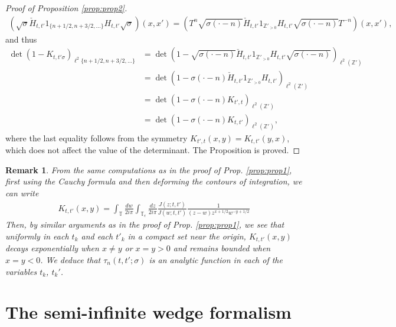 \documentclass[12pt]{amsart}
\newtheorem{rem}[thm]{Remark}
\theoremstyle{definition}
\newcommand{\Z}{\mathbb{Z}}
\newcommand{\T}{\mathbb{T}}
\begin{document}
\begin{proof}[Proof of Proposition \ref{prop:prop2}]
\begin{align*}
    \left(\sqrt{\sigma} \check{H}_{t,t'} \mathfrak{1}_{\{n+1/2,n+3/2,\dots\}}H_{t,t'} \sqrt{\sigma}\right)(x,x')=\left(T^n\sqrt{\sigma(\cdot -n)}\check{H}_{t,t'}\mathfrak{1}_{\Z'_{>0}}H_{t,t'}\sqrt{\sigma(\cdot -n)} T^{-n}\right)(x,x'),
\end{align*}
and thus
\begin{align*}
\det \left( 1 -K_{t,t'\sigma} \right)_{\ell^2 \{n+1/2,n+3/2, \dots \}}&= \det \left( 1- \sqrt{\sigma (\cdot -n) } \check{H}_{t,t'} \mathfrak{1}_{\Z'_{> 0}} H_{t,t'} \sqrt{\sigma( \cdot - n) } \right)_{\ell^2(\Z')} \\
&= \det \left( 1- \sigma( \cdot - n ) \check{ H}_{t,t'} \mathfrak{1}_{ \Z'_{> 0}} H_{t,t'}  \right)_{\ell^2(\Z')}\\
&= \det\left(1- \sigma(\cdot-n)K_{t',t}\right)_{\ell^2(\Z')}\\
&=\det\left(1- \sigma(\cdot -n)K_{t,t'}\right)_{\ell^2(\Z')},
\end{align*}
where the last equality follows from the symmetry $K_{t',t}(x,y)=K_{t,t'}(y,x)$, which does not affect the value of the determinant. The Proposition is proved.
\end{proof}
\begin{rem} \label{rem:tauanalytic}
From the same computations as in the proof of Prop. \ref{prop:prop1}, first using the Cauchy formula and then deforming the contours of integration, we can write
\begin{align*}
    K_{t,t'}(x,y)= \int_{\T} \frac{dw}{2i \pi} \int_{\T_{\epsilon}} \frac{dz}{2i \pi} \frac{J(z;t,t')}{J(w;t,t')} \frac{1}{(z-w)z^{x+1/2}w^{-y+1/2}}
\end{align*}
Then, by similar arguments as in the proof of Prop. \ref{prop:prop1}, we see that uniformly in each $t_k$ and each $t'_k$ in a compact set near the origin, $K_{t,t'}(x,y)$ decays exponentially when $x \neq y$ or $x=y>0$ and remains bounded when $x=y<0$. We deduce that $\tau_n(t,t';\sigma)$ is an analytic function in each of the variables $t_k$, $t_k'$.
\end{rem}
\section{The semi-infinite wedge formalism} \label{section:infinitewedge}
\end{document}
